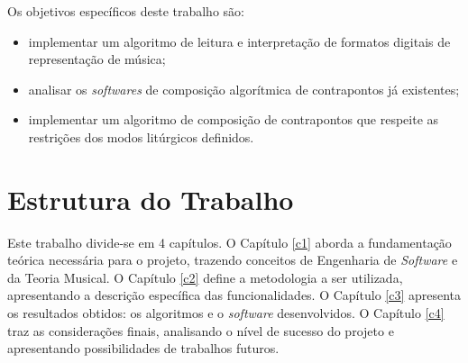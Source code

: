     Os objetivos específicos deste trabalho são:

    \begin{itemize}
      \item implementar um algoritmo de leitura e interpretação de formatos digitais de representação de música;
      \item analisar os \textit{softwares} de composição algorítmica de contrapontos já existentes;
      \item implementar um algoritmo de composição de contrapontos que respeite as restrições dos modos litúrgicos definidos.
    \end{itemize}

  \section*{Estrutura do Trabalho}

    Este trabalho divide-se em 4 capítulos. O Capítulo \ref{c1} aborda a fundamentação teórica necessária para o projeto, trazendo conceitos de Engenharia de \textit{Software} e da Teoria Musical. O Capítulo \ref{c2} define a metodologia a ser utilizada, apresentando a descrição específica das funcionalidades. O Capítulo \ref{c3} apresenta os resultados obtidos: os algoritmos e o \textit{software} desenvolvidos. O Capítulo \ref{c4} traz as considerações finais, analisando o nível de sucesso do projeto e apresentando possibilidades de trabalhos futuros.

